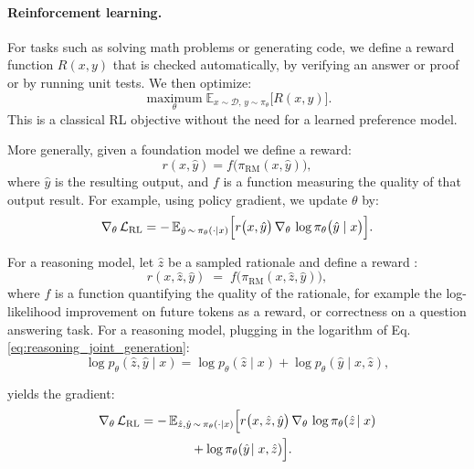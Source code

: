 \paragraph{Reinforcement learning.} 
For tasks such as solving math problems or generating code, we define a reward function $R(x, y)$ that is checked automatically, by verifying an answer or proof or by running unit tests. We then optimize:
\[
   \operatorname*{maximum}_{\theta}
   \mathbb{E}_{x \sim \mathcal{D},\,y \sim \pi_\theta}\bigl[R(x, y)\bigr].
\]
This is a classical RL objective without the need for a learned preference model. 

More generally, given a foundation model we define a reward: 
\begin{equation}
r(x,\hat{y}) = f\bigl(\pi_{\mathrm{RM}}(x,\hat{y})\bigr),
\end{equation}
where $\hat{y}$ is the resulting output, and $f$ is a function measuring the quality of that output result. For example, using policy gradient, we update $\theta$ by:
\begin{equation}
\nabla_{\theta}\,\mathcal{L}_{\mathrm{RL}} 
= -\,\mathbb{E}_{\hat{y}\,\sim\,\pi_\theta(\cdot\mid x)}
\Bigl[
   r\bigl(x,\hat{y}\bigr)\,\nabla_{\theta}\,
   \log \pi_\theta\bigl(\hat{y}\mid x\bigr)
\Bigr].
\end{equation}

For a reasoning model, let $\hat{z}$ be a sampled rationale and define a reward \cite{zelikman2024quiet}: 
\begin{equation}
r(x,\hat{z},\hat{y}) \;=\; f\bigl(\pi_{\mathrm{RM}}(x,\hat{z},\hat{y})\bigr),
\end{equation}
where $f$ is a function quantifying the quality of the rationale, for example the log-likelihood improvement on future tokens as a reward, or 
correctness on a question answering task. For a reasoning model, plugging in the logarithm of Eq. \ref{eq:reasoning_joint_generation}:
\begin{equation}
\log p_\theta(\hat{z},\hat{y}\!\mid\! x)
=
\log p_\theta(\hat{z}\!\mid\!x) + \log p_\theta(\hat{y}\mid x,\hat{z}), 
\end{equation}

yields the gradient:
\begin{equation}
\begin{aligned}
\nabla_{\theta}\,\mathcal{L}_{\mathrm{RL}} 
&= -\,\mathbb{E}_{\hat{z}, \hat{y}\,\sim\,\pi_\theta(\cdot \mid x)} \Bigl[
   r\bigl(x,\hat{z},\hat{y}\bigr)\,\nabla_{\theta}\,
   \log \pi_\theta(\hat{z}\!\mid x) \\
&\qquad\qquad
   + \log \pi_\theta(\hat{y}\!\mid x,\hat{z})
\Bigr].
\end{aligned}
\end{equation}

